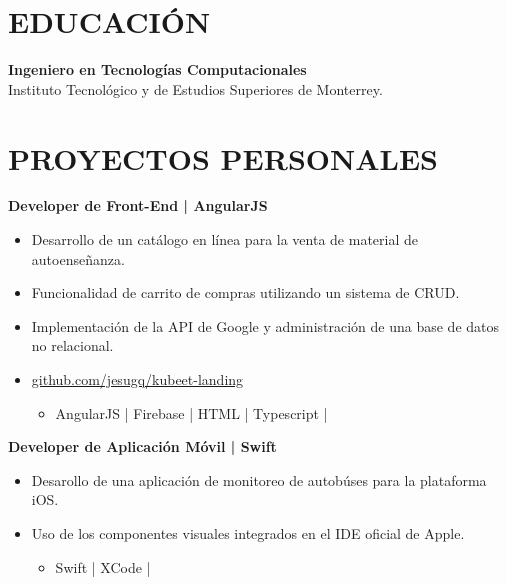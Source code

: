 \documentclass{res}
\begin{document}
\address{
}

\begin{resume}
    \separator

    \section{\large{EDUCACIÓN}} \jump\jump
    \textbf{Ingeniero en Tecnologías Computacionales} \jump
     \\
    Instituto Tecnológico y de Estudios Superiores de Monterrey.
    
    \longjump

    \section{\large{PROYECTOS PERSONALES}} \jump\jump
    \textbf{Developer de Front-End | AngularJS} \jump
    \begin{itemize}
        \item Desarrollo de un catálogo en línea para la venta de material de autoenseñanza.
        \item Funcionalidad de carrito de compras utilizando un sistema de CRUD.
        \item Implementación de la API de Google y administración de una base de datos no relacional.
        \item \href{https://github.com/jesugq/kubeet-landing}{github.com/jesugq/kubeet-landing}
        \begin{itemize}
            \item AngularJS | Firebase | HTML | Typescript |
        \end{itemize}
    \end{itemize}

    \textbf{Developer de Aplicación Móvil | Swift} \jump
    \begin{itemize}
        \item Desarollo de una aplicación de monitoreo de autobúses para la plataforma iOS.
        \item Uso de los componentes visuales integrados en el IDE oficial de Apple.
        \begin{itemize}
            \item Swift | XCode |
        \end{itemize}
    \end{itemize}


\end{resume}
\end{document}
